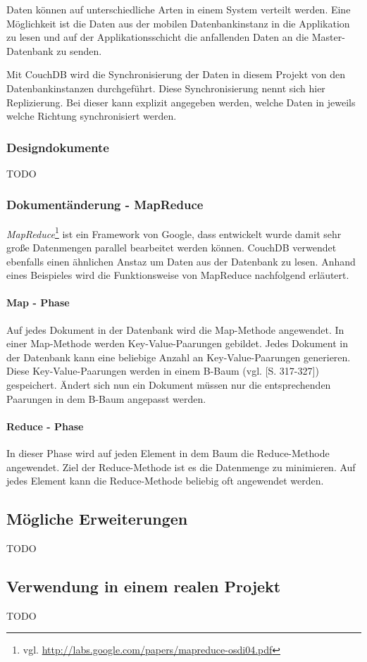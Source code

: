 Daten können auf unterschiedliche Arten in einem System verteilt werden. Eine
	Möglichkeit ist die Daten aus der mobilen Datenbankinstanz in die Applikation
	zu lesen und auf der Applikationsschicht die anfallenden Daten an die
	Master-Datenbank zu senden.

Mit CouchDB wird die Synchronisierung der Daten in diesem Projekt von den
	Datenbankinstanzen durchgeführt. Diese Synchronisierung nennt sich hier
	Replizierung. Bei dieser kann explizit angegeben werden, welche Daten
	in jeweils welche Richtung synchronisiert werden.

\subsubsection{Designdokumente}

TODO

\subsubsection{Dokumentänderung - MapReduce}

\emph{MapReduce}\footnote{vgl. \url{http://labs.google.com/papers/mapreduce-osdi04.pdf}}
	ist ein Framework von Google, dass entwickelt wurde damit sehr große
	Datenmengen parallel bearbeitet werden können. CouchDB verwendet ebenfalls
	einen ähnlichen Anstaz um Daten aus der Datenbank zu lesen. Anhand eines
	Beispieles wird die Funktionsweise von MapReduce nachfolgend erläutert.

\paragraph{Map - Phase} Auf jedes Dokument in der Datenbank wird die Map-Methode
	angewendet. In einer Map-Methode werden Key-Value-Paarungen gebildet. Jedes
	Dokument in der Datenbank kann eine beliebige Anzahl an Key-Value-Paarungen
	generieren. Diese Key-Value-Paarungen werden in einem B-Baum (vgl.
	\cite{Ottmann96}[S. 317-327]) gespeichert. Ändert sich nun ein Dokument müssen
	nur die entsprechenden Paarungen in	dem B-Baum angepasst werden. 

\paragraph{Reduce - Phase} In dieser Phase wird auf jeden Element in dem Baum die
	Reduce-Methode angewendet. Ziel der Reduce-Methode ist es die Datenmenge zu
	minimieren. Auf jedes Element kann die Reduce-Methode beliebig oft angewendet
	werden.

\subsection{Mögliche Erweiterungen}

TODO

\subsection{Verwendung in einem realen Projekt}

TODO